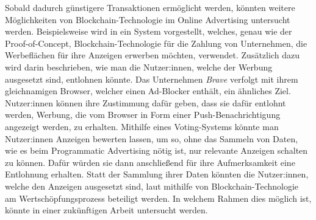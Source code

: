 Sobald dadurch günstigere Transaktionen ermöglicht werden, könnten weitere Möglichkeiten von Blockchain-Technologie im Online Advertising untersucht werden. Beispielsweise wird in \cite{ding_2021} ein System vorgestellt, welches, genau wie der Proof-of-Concept, Blockchain-Technologie für die Zahlung von Unternehmen, die Werbeflächen für ihre Anzeigen erwerben möchten, verwendet. Zusätzlich dazu wird darin beschrieben, wie man die Nutzer:innen, welche der Werbung ausgesetzt sind, entlohnen könnte. Das Unternehmen \emph{Brave} verfolgt mit ihrem gleichnamigen Browser, welcher einen Ad-Blocker enthält, ein ähnliches Ziel. Nutzer:innen können ihre Zustimmung dafür geben, dass sie dafür entlohnt werden, Werbung, die vom Browser in Form einer Push-Benachrichtigung angezeigt werden, zu erhalten. Mithilfe eines Voting-Systems könnte man Nutzer:innen Anzeigen bewerten lassen, um so, ohne das Sammeln von Daten, wie es beim Programmatic Advertising nötig ist, nur relevante Anzeigen schalten zu können. Dafür würden sie dann anschließend für ihre Aufmerksamkeit eine Entlohnung erhalten. Statt der Sammlung ihrer Daten könnten die Nutzer:innen, welche den Anzeigen ausgesetzt sind, laut \cite{campbell_2018} mithilfe von Blockchain-Technologie am Wertschöpfungsprozess beteiligt werden. In welchem Rahmen dies möglich ist, könnte in einer zukünftigen Arbeit untersucht werden.


